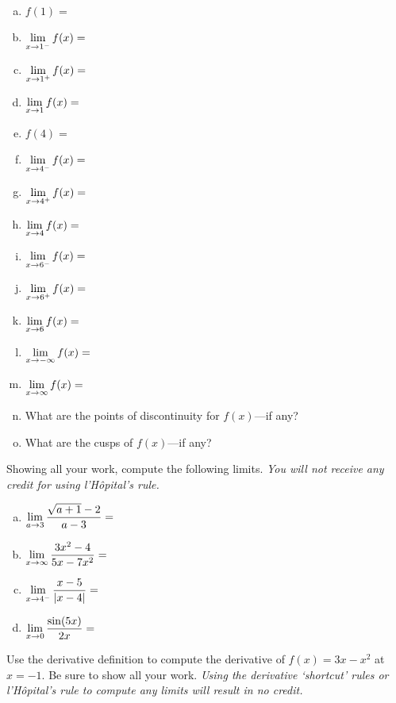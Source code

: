 \documentclass[12pt,letterpaper]{exam}
\begin{document}
\begin{questions}
\begin{enumerate}[(a)]
\item $f(1)=$ \vfill
\item $\displaystyle\lim_{x \to 1^-} f(x)=$ \vfill
\item $\displaystyle\lim_{x \to 1^+} f(x)=$ \vfill
\item $\displaystyle\lim_{x \to 1} f(x)=$ \vfill
\item $f(4)=$ \vfill
\item $\displaystyle\lim_{x \to 4^-} f(x)=$ \vfill
\item $\displaystyle\lim_{x \to 4^+} f(x)=$ \vfill
\item $\displaystyle\lim_{x \to 4} f(x)=$ \vfill
\item $\displaystyle\lim_{x \to 6^-} f(x)=$ \vfill
\item $\displaystyle\lim_{x \to 6^+} f(x)=$ \vfill
\item $\displaystyle\lim_{x \to 6} f(x)=$ \vfill
\item $\displaystyle\lim_{x \to -\infty} f(x)=$ \vfill
\item $\displaystyle\lim_{x \to \infty} f(x)=$ \vfill
\item What are the points of discontinuity for $f(x)$---if any? \vfill
\item What are the cusps of $f(x)$---if any? \vfill
\end{enumerate}



\newpage
\question[20] Showing all your work, compute the following limits. {\itshape You will not receive any credit for using l'H\^opital's rule.} \par\vspace{0.3cm}
	\begin{enumerate}[(a)]
	\item $\displaystyle\lim_{a \to 3} \dfrac{\sqrt{a + 1} - 2}{a - 3}=$ \vfill
	\item $\displaystyle\lim_{x \to \infty} \dfrac{3x^2 - 4}{5x - 7x^2}=$ \vfill
	
	\newpage
	
	
	\item $\displaystyle\lim_{x \to 4^-} \dfrac{x - 5}{|x - 4|}=$ \vfill
	\item $\displaystyle\lim_{x \to 0} \dfrac{\sin(5 x)}{2x}=$ \vfill
	\end{enumerate}



\newpage
\question[20] Use the derivative definition to compute the derivative of $f(x)= 3x - x^2$ at $x= -1$. Be sure to show all your work. {\itshape Using the derivative `shortcut' rules or l'H\^opital's rule to compute any limits will result in no credit.}




\end{questions}
\end{document}
